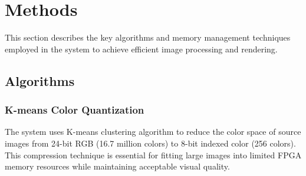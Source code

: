 \documentclass[12pt,a4paper]{article}
\begin{document}
\section{Methods}

This section describes the key algorithms and memory management techniques employed in the system to achieve efficient image processing and rendering.

\subsection{Algorithms}

\subsubsection{K-means Color Quantization}
The system uses K-means clustering algorithm to reduce the color space of source images from 24-bit RGB (16.7 million colors) to 8-bit indexed color (256 colors). This compression technique is essential for fitting large images into limited FPGA memory resources while maintaining acceptable visual quality.
\end{document}
